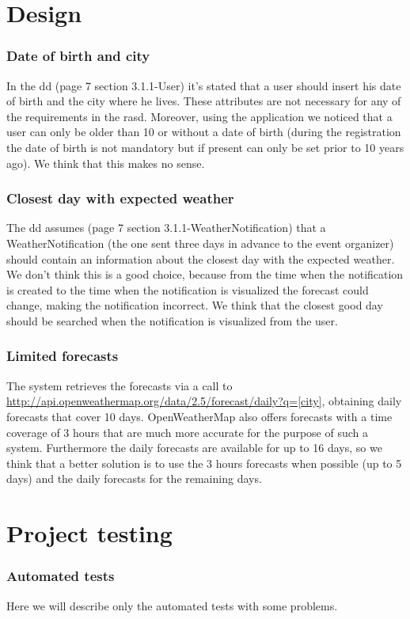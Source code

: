 \documentclass[10pt,a4paper,titlepage]{article}
\begin{document}
\part{Design}
\label{part2}
\section{Date of birth and city}
In the dd (page 7 section 3.1.1-User) it's stated that a user should insert his date of birth and the city where he lives. These attributes are not necessary for any of the requirements in the rasd. Moreover, using the application we noticed that a user can only be older than 10 or without a date of birth (during the registration the date of birth is not mandatory but if present can only be set prior to 10 years ago). We think that this makes no sense.

\section{Closest day with expected weather}
The dd assumes (page 7 section 3.1.1-WeatherNotification) that a WeatherNotification (the one sent three days in advance to the event organizer) should contain an information about the closest day with the expected weather.
We don't think this is a good choice, because from the time when the notification is created to the time when the notification is visualized the forecast could change, making the notification incorrect. We think that the closest good day should be searched when the notification is visualized from the user.

\section{Limited forecasts}
The system retrieves the forecasts via a call to \url{http://api.openweathermap.org/data/2.5/forecast/daily?q=[city]}, obtaining daily forecasts that cover 10 days. OpenWeatherMap also offers forecasts with a time coverage of 3 hours that are much more accurate for the purpose of such a system. Furthermore the daily forecasts are available for up to 16 days, so we think that a better solution is to use the 3 hours forecasts when possible (up to 5 days) and the daily forecasts for the remaining days.

\pagebreak
\part{Project testing}
\label{part3}
\section{Automated tests}
Here we will describe only the automated tests with some problems.
\end{document}
